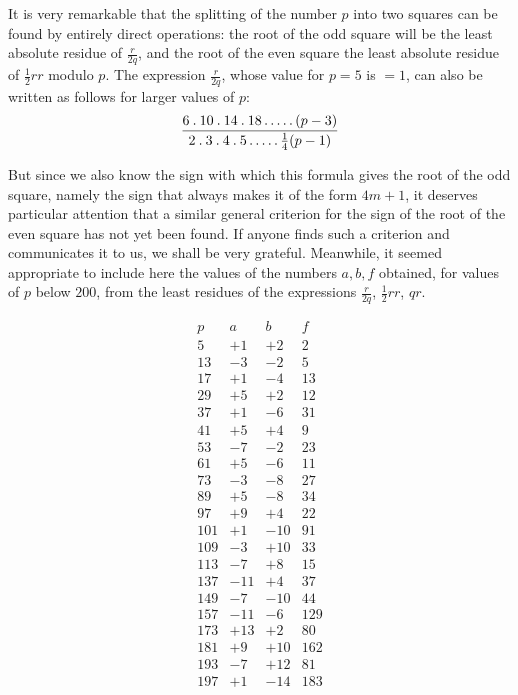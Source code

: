 It is very remarkable that the splitting of the number $p$ into two squares can be found by entirely direct operations: the root of the odd square will be the least absolute residue of $\frac r{2q}$, and the root of the even square the least absolute residue of $\frac12rr$ modulo $p$. The expression $\frac r{2q}$, whose value for $p=5$ is $=1$, can also be written as follows for larger values of $p$:
\[
\frac{6\mathbin{.}10\mathbin{.}14\mathbin{.}18\mathinner{.\,.\,.\,.\,.}(p-3)}{2\mathbin{.}3\mathbin{.}4\mathbin{.}5\mathinner{.\,.\,.\,.\,.}\frac14(p-1)}
\]

But since we also know the sign with which this formula gives the root of the odd square, namely the sign that always makes it of the form $4m+1$, it deserves particular attention that a similar general criterion for the sign of the root of the even square has not yet been found. If anyone finds such a criterion and communicates it to us, we shall be very grateful. Meanwhile, it seemed appropriate to include here the values of the numbers $a,b,f$ obtained, for values of $p$ below $200$, from the least residues of the expressions $\frac r{2q}$, $\frac12rr$, $qr$.

%
\[
\begin{array}{r|r|r|r}
p&a&b&f\\\hline
5&+1&+2&2\\
13&-3&-2&5\\
17&+1&-4&13\\
29&+5&+2&12\\
37&+1&-6&31\\
41&+5&+4&9\\
53&-7&-2&23\\
61&+5&-6&11\\
73&-3&-8&27\\
89&+5&-8&34\\
97&+9&+4&22\\
101&+1&-10&91\\
109&-3&+10&33\\
113&-7&+8&15\\
137&-11&+4&37\\
149&-7&-10&44\\
157&-11&-6&129\\
173&+13&+2&80\\
181&+9&+10&162\\
193&-7&+12&81\\
197&+1&-14&183
\end{array}
\]
